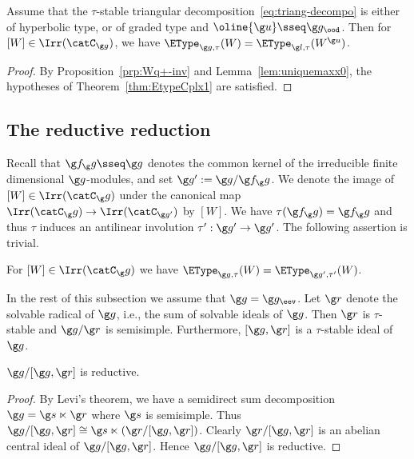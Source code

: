 \documentclass[12pt]{amsart}
\begin{document}
\begin{cor}
\label{thm:EtypeCplx}
Assume that the $\tau$-stable triangular decomposition~\eqref{eq:triang-decompo} is either of hyperbolic type, or of  graded type and  $\oline{\g u}\sseq \g g_\ood$.
 Then 
for $[W]\in\Irr(\catC_{\g g})$, we have $\EType_{\g g,\tau}(W)= \EType_{\g l,\tau}(W^{\g u})$. 
\end{cor}
\begin{proof}
By Proposition~\ref{prp:Wq+-inv} and Lemma~\ref{lem:uniquemaxx0},  the hypotheses of 
Theorem~\ref{thm:EtypeCplx1} are satisfied.
\end{proof}


\subsection{The reductive reduction}
\label{subsec:Liered}
Recall that $\g f_\g g\sseq\g g$ denotes the common kernel of the irreducible finite dimensional $\g g$-modules, and set $\g g':=\g g/\g f_\g g$. We denote the image of $[W]\in\Irr(\catC_\g g)$ under the canonical 
 map 
$\Irr(\catC_\g g)\to\Irr(\catC_{\g g'})$ 
 by $[W]$. We have  $\tau(\g f_\g g)=\g f_\g g$ and thus $\tau$ induces an  antilinear involution $\tau':\g g'\to\g g'$. The following assertion is trivial.
\begin{prp}
\label{thm:triv-reduction} For $[W]\in\Irr(\catC_\g g)$ we have $\EType_{\g g,\tau}(W)=\EType_{\g g',\tau'}(W)$. 
\end{prp}
In the rest of this subsection we assume that $\g g=\g g_\eev$. Let $\g r$ denote the solvable radical of $\g g$, i.e., the sum of solvable ideals of $\g g$. Then $\g r$ is $\tau$-stable and $\g g/\g r$ is semisimple. Furthermore, $[\g g,\g r]$ is a $\tau$-stable ideal of $\g g$. 
\begin{lem}
$\g g/[\g g,\g r]$ is reductive.
\end{lem}
\begin{proof}
By Levi's theorem, we have a semidirect sum decomposition $\g g=\g s\ltimes \g r$ where $\g s$ is semisimple. Thus  $\g g/[\g g,\g r]\cong \g s\ltimes (\g r/[\g g,\g r])$. Clearly $\g r/[\g g,\g r]$ is an abelian central ideal of $\g g/[\g g,\g r]$. Hence $\g g/[\g g,\g r]$ is reductive.  
\end{proof}
\end{document}
